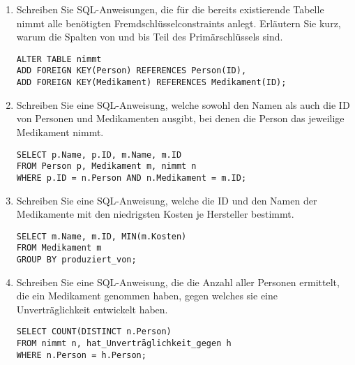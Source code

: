 \documentclass{lehramt-informatik-aufgabe}
\begin{document}
\begin{enumerate}


\item Schreiben Sie SQL-Anweisungen, die für die bereits existierende
Tabelle nimmt alle benötigten Fremdschlüsselconstraints anlegt.
Erläutern Sie kurz, warum die Spalten von und bis Teil des
Primärschlüssels sind.

\begin{liAntwort}
\begin{verbatim}
ALTER TABLE nimmt
ADD FOREIGN KEY(Person) REFERENCES Person(ID),
ADD FOREIGN KEY(Medikament) REFERENCES Medikament(ID);
\end{verbatim}
\end{liAntwort}


\item Schreiben Sie eine SQL-Anweisung, welche sowohl den Namen als auch
die ID von Personen und Medikamenten ausgibt, bei denen die Person das
jeweilige Medikament nimmt.

\begin{liAntwort}
\begin{verbatim}
SELECT p.Name, p.ID, m.Name, m.ID
FROM Person p, Medikament m, nimmt n
WHERE p.ID = n.Person AND n.Medikament = m.ID;
\end{verbatim}
\end{liAntwort}


\item Schreiben Sie eine SQL-Anweisung, welche die ID und den Namen der
Medikamente mit den niedrigsten Kosten je Hersteller bestimmt.

\begin{liAntwort}
\begin{verbatim}
SELECT m.Name, m.ID, MIN(m.Kosten)
FROM Medikament m
GROUP BY produziert_von;
\end{verbatim}
\end{liAntwort}


\item Schreiben Sie eine SQL-Anweisung, die die Anzahl aller Personen
ermittelt, die ein Medikament genommen haben, gegen welches sie eine
Unverträglichkeit entwickelt haben.

\begin{liAntwort}
\begin{verbatim}
SELECT COUNT(DISTINCT n.Person)
FROM nimmt n, hat_Unverträglichkeit_gegen h
WHERE n.Person = h.Person;
\end{verbatim}
\end{liAntwort}


\end{enumerate}
\end{document}
